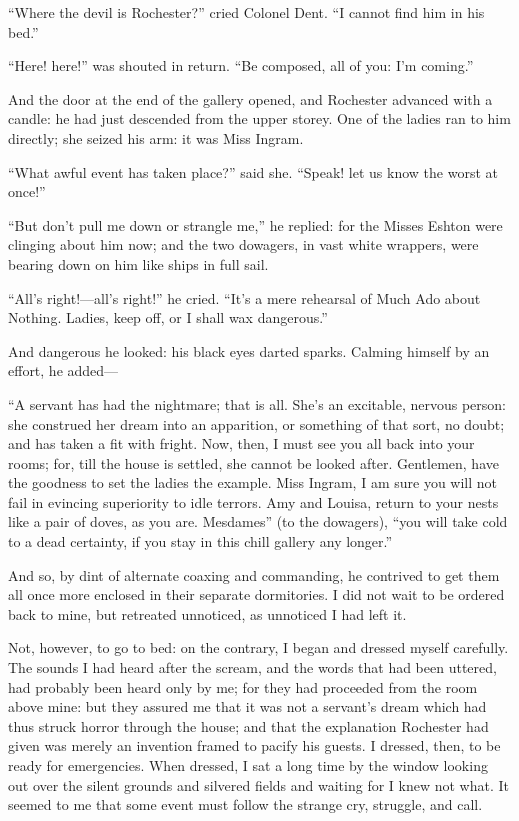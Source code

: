 \enquote{Where the devil is Rochester?} cried Colonel Dent. \enquote{I
cannot find him in his bed.}

\enquote{Here! here!} was shouted in return. \enquote{Be composed, all
of you: I'm coming.}

And the door at the end of the gallery opened, and \Mr{} Rochester
advanced with a candle: he had just descended from the upper storey. 
One of the ladies ran to him directly; she seized his arm: it was Miss
Ingram.

\enquote{What awful event has taken place?} said she. \enquote{Speak!
let us know the worst at once!}

\enquote{But don't pull me down or strangle me,} he replied: for the
Misses Eshton were clinging about him now; and the two dowagers, in vast
white wrappers, were bearing down on him like ships in full sail.

\enquote{All's right!---all's right!} he cried. \enquote{It's a mere
rehearsal of Much Ado about Nothing. Ladies, keep off, or I shall wax
dangerous.}

And dangerous he looked: his black eyes darted sparks. Calming himself
by an effort, he added---

\enquote{A servant has had the nightmare; that is all. She's an
excitable, nervous person: she construed her dream into an apparition,
or something of that sort, no doubt; and has taken a fit with fright. 
Now, then, I must see you all back into your rooms; for, till the house
is settled, she cannot be looked after. Gentlemen, have the goodness to
set the ladies the example. Miss Ingram, I am sure you will not fail in
evincing superiority to idle terrors. Amy and Louisa, return to your
nests like a pair of doves, as you are.  Mesdames} (to the dowagers),
\enquote{you will take cold to a dead certainty, if you stay in this
chill gallery any longer.}

And so, by dint of alternate coaxing and commanding, he contrived to get
them all once more enclosed in their separate dormitories. I did not
wait to be ordered back to mine, but retreated unnoticed, as unnoticed I
had left it.

Not, however, to go to bed: on the contrary, I began and dressed myself
carefully. The sounds I had heard after the scream, and the words that
had been uttered, had probably been heard only by me; for they had
proceeded from the room above mine: but they assured me that it was not
a servant's dream which had thus struck horror through the house; and
that the explanation \Mr{} Rochester had given was merely an invention
framed to pacify his guests. I dressed, then, to be ready for
emergencies. When dressed, I sat a long time by the window looking out
over the silent grounds and silvered fields and waiting for I knew not
what. It seemed to me that some event must follow the strange cry,
struggle, and call.

